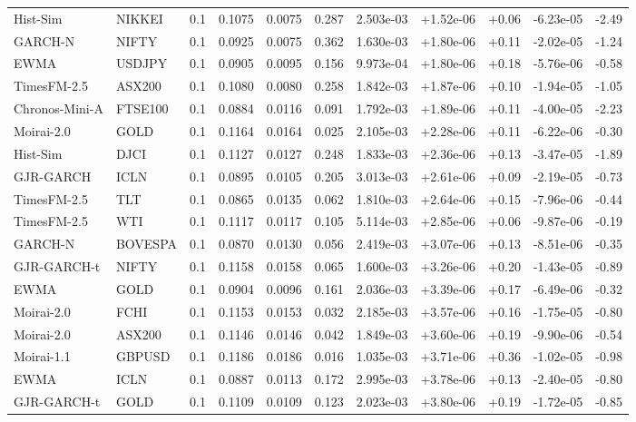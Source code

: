 \begin{tabular}{llrrrrrrrrr}
Hist-Sim & NIKKEI & 0.1 & 0.1075 & 0.0075 & 0.287 & 2.503e-03 & +1.52e-06 & +0.06 & -6.23e-05 & -2.49 \\
GARCH-N & NIFTY & 0.1 & 0.0925 & 0.0075 & 0.362 & 1.630e-03 & +1.80e-06 & +0.11 & -2.02e-05 & -1.24 \\
EWMA & USDJPY & 0.1 & 0.0905 & 0.0095 & 0.156 & 9.973e-04 & +1.80e-06 & +0.18 & -5.76e-06 & -0.58 \\
TimesFM-2.5 & ASX200 & 0.1 & 0.1080 & 0.0080 & 0.258 & 1.842e-03 & +1.87e-06 & +0.10 & -1.94e-05 & -1.05 \\
Chronos-Mini-A & FTSE100 & 0.1 & 0.0884 & 0.0116 & 0.091 & 1.792e-03 & +1.89e-06 & +0.11 & -4.00e-05 & -2.23 \\
Moirai-2.0 & GOLD & 0.1 & 0.1164 & 0.0164 & 0.025 & 2.105e-03 & +2.28e-06 & +0.11 & -6.22e-06 & -0.30 \\
Hist-Sim & DJCI & 0.1 & 0.1127 & 0.0127 & 0.248 & 1.833e-03 & +2.36e-06 & +0.13 & -3.47e-05 & -1.89 \\
GJR-GARCH & ICLN & 0.1 & 0.0895 & 0.0105 & 0.205 & 3.013e-03 & +2.61e-06 & +0.09 & -2.19e-05 & -0.73 \\
TimesFM-2.5 & TLT & 0.1 & 0.0865 & 0.0135 & 0.062 & 1.810e-03 & +2.64e-06 & +0.15 & -7.96e-06 & -0.44 \\
TimesFM-2.5 & WTI & 0.1 & 0.1117 & 0.0117 & 0.105 & 5.114e-03 & +2.85e-06 & +0.06 & -9.87e-06 & -0.19 \\
GARCH-N & BOVESPA & 0.1 & 0.0870 & 0.0130 & 0.056 & 2.419e-03 & +3.07e-06 & +0.13 & -8.51e-06 & -0.35 \\
GJR-GARCH-t & NIFTY & 0.1 & 0.1158 & 0.0158 & 0.065 & 1.600e-03 & +3.26e-06 & +0.20 & -1.43e-05 & -0.89 \\
EWMA & GOLD & 0.1 & 0.0904 & 0.0096 & 0.161 & 2.036e-03 & +3.39e-06 & +0.17 & -6.49e-06 & -0.32 \\
Moirai-2.0 & FCHI & 0.1 & 0.1153 & 0.0153 & 0.032 & 2.185e-03 & +3.57e-06 & +0.16 & -1.75e-05 & -0.80 \\
Moirai-2.0 & ASX200 & 0.1 & 0.1146 & 0.0146 & 0.042 & 1.849e-03 & +3.60e-06 & +0.19 & -9.90e-06 & -0.54 \\
Moirai-1.1 & GBPUSD & 0.1 & 0.1186 & 0.0186 & 0.016 & 1.035e-03 & +3.71e-06 & +0.36 & -1.02e-05 & -0.98 \\
EWMA & ICLN & 0.1 & 0.0887 & 0.0113 & 0.172 & 2.995e-03 & +3.78e-06 & +0.13 & -2.40e-05 & -0.80 \\
GJR-GARCH-t & GOLD & 0.1 & 0.1109 & 0.0109 & 0.123 & 2.023e-03 & +3.80e-06 & +0.19 & -1.72e-05 & -0.85 \\

\end{tabular}
